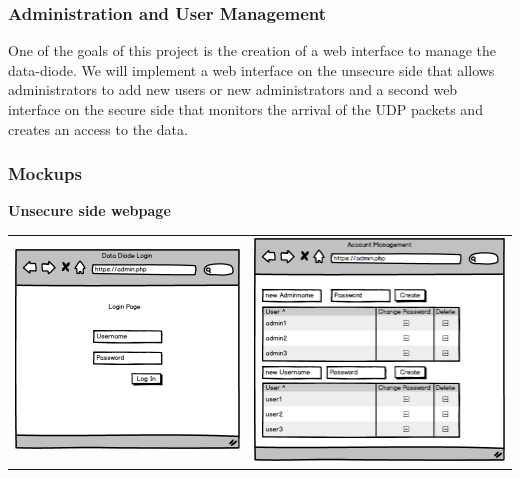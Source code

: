 \documentclass[a4paper,11pt]{article}
\begin{document}
\subsubsection{Administration and User Management}
\label{sec:administration}
One of the goals of this project is the creation of a web interface to manage the data-diode. We will implement a web interface on the unsecure side that allows administrators to add new users or new administrators and a second web interface on the secure side that monitors the arrival of the UDP packets and creates an access to the data.

\subsubsection{Mockups}
\textbf{Unsecure side webpage}
\begin{center}
\begin{tabular}{cc}
\includegraphics[scale=0.5]{img/outsideLogin.png} & \includegraphics[scale=0.45]{img/outsideManagement.png}\\
\end{tabular}
\end{center} 
\end{document}
